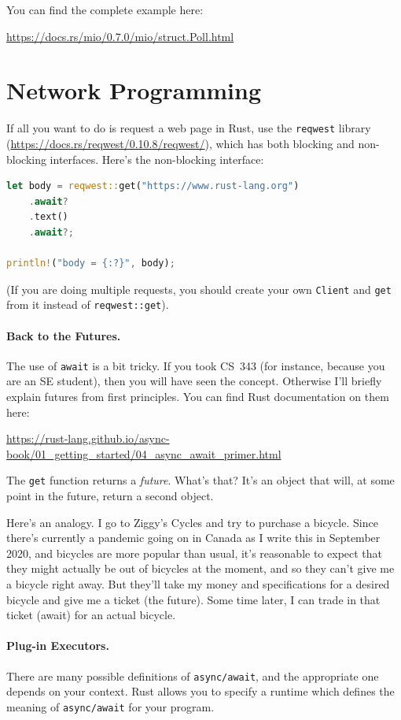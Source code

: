 You can find the complete example here:
\begin{center}
\url{https://docs.rs/mio/0.7.0/mio/struct.Poll.html}
\end{center}

\section*{Network Programming}
If all you want to do is request a web page in Rust, use
the \texttt{reqwest} library (\url{https://docs.rs/reqwest/0.10.8/reqwest/}),
which has both blocking and non-blocking interfaces. Here's the
non-blocking interface:
    \begin{lstlisting}[language=Rust]
let body = reqwest::get("https://www.rust-lang.org")
    .await?
    .text()
    .await?;

println!("body = {:?}", body);
\end{lstlisting}
(If you are doing multiple requests,
you should create your own \texttt{Client} and \texttt{get} from it instead of
\texttt{reqwest::get}).

\paragraph{Back to the Futures.}
The use of \texttt{await} is a bit tricky. If you took CS~343
(for instance, because you are an SE student), then you will have seen
the concept. Otherwise I'll briefly explain futures from first principles.
You can find Rust documentation on them here:
\begin{center}
\url{https://rust-lang.github.io/async-book/01_getting_started/04_async_await_primer.html}
\end{center}

The \texttt{get} function returns a \emph{future}. What's that?  It's
an object that will, at some point in the future, return a second
object.

Here's an analogy. I go to Ziggy's Cycles and try to purchase a
bicycle. Since there's currently a pandemic going on in Canada as I
write this in September 2020, and bicycles are more popular than
usual, it's reasonable to expect that they might actually be out of
bicycles at the moment, and so they can't
give me a bicycle right away.  But they'll take my money and
specifications for a desired bicycle and give me a ticket (the
future). Some time later, I can trade in that ticket (await) for an
actual bicycle.

\paragraph{Plug-in Executors.}
There are many possible definitions of \texttt{async/await}, and the appropriate
one depends on your context. Rust allows you to specify a runtime
which defines the meaning of \texttt{async/await} for your program.

